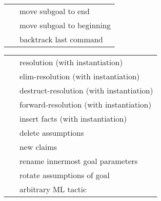 \begin{isabellebody}
\begin{isamarkuptext}
\begin{tabular}{ll}
    \hyperlink{command.defer}{\mbox{\isa{\isacommand{defer}}}}~\isa{n} & move subgoal to end \\
    \hyperlink{command.prefer}{\mbox{\isa{\isacommand{prefer}}}}~\isa{n} & move subgoal to beginning \\
    \hyperlink{command.back}{\mbox{\isa{\isacommand{back}}}} & backtrack last command \\
  \end{tabular}%
\end{isamarkuptext}%
\isamarkuptrue%
%
\isamarkuptrue%
%
\begin{isamarkuptext}%
\begin{tabular}{ll}
    \hyperlink{method.rule-tac}{\mbox{\isa{rule{\isaliteral{5F}{\isacharunderscore}}tac}}}~\isa{insts} & resolution (with instantiation) \\
    \hyperlink{method.erule-tac}{\mbox{\isa{erule{\isaliteral{5F}{\isacharunderscore}}tac}}}~\isa{insts} & elim-resolution (with instantiation) \\
    \hyperlink{method.drule-tac}{\mbox{\isa{drule{\isaliteral{5F}{\isacharunderscore}}tac}}}~\isa{insts} & destruct-resolution (with instantiation) \\
    \hyperlink{method.frule-tac}{\mbox{\isa{frule{\isaliteral{5F}{\isacharunderscore}}tac}}}~\isa{insts} & forward-resolution (with instantiation) \\
    \hyperlink{method.cut-tac}{\mbox{\isa{cut{\isaliteral{5F}{\isacharunderscore}}tac}}}~\isa{insts} & insert facts (with instantiation) \\
    \hyperlink{method.thin-tac}{\mbox{\isa{thin{\isaliteral{5F}{\isacharunderscore}}tac}}}~\isa{{\isaliteral{5C3C7068693E}{\isasymphi}}} & delete assumptions \\
    \hyperlink{method.subgoal-tac}{\mbox{\isa{subgoal{\isaliteral{5F}{\isacharunderscore}}tac}}}~\isa{{\isaliteral{5C3C7068693E}{\isasymphi}}} & new claims \\
    \hyperlink{method.rename-tac}{\mbox{\isa{rename{\isaliteral{5F}{\isacharunderscore}}tac}}}~\isa{x} & rename innermost goal parameters \\
    \hyperlink{method.rotate-tac}{\mbox{\isa{rotate{\isaliteral{5F}{\isacharunderscore}}tac}}}~\isa{n} & rotate assumptions of goal \\
    \hyperlink{method.tactic}{\mbox{\isa{tactic}}}~\isa{{\isaliteral{22}{\isachardoublequote}}text{\isaliteral{22}{\isachardoublequote}}} & arbitrary ML tactic \\

\end{tabular}
\end{isamarkuptext}
\end{isabellebody}
